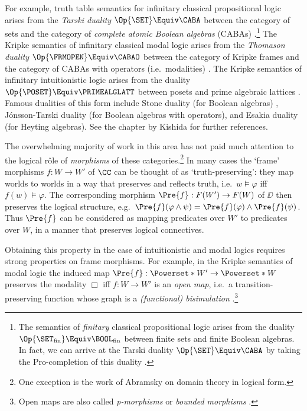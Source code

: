 \documentclass[a4paper,UKenglish,cleveref, autoref]{lipics-v2021}
\begin{document}
For example, truth table semantics for infinitary classical propositional logic
arises from the \emph{Tarski duality} $\Op{\SET} \Equiv \CABA$ between the
category of sets and the category of \emph{complete atomic Boolean algebras}
(CABAs) \cite[\S 1]{kishida_2018}.\footnote{The semantics of \emph{finitary} classical
  propositional logic arises from the duality 
  \(\Op{\SET_{\text{fin}}} \Equiv \BOOL_{\text{fin}}\)
  between finite sets and finite Boolean algebras. In
  fact, we can arrive at the Tarski duality \(\Op{\SET} \Equiv \CABA\) by taking
the Pro-completion of this duality \cite{kurz_2012}.}
The Kripke semantics of infinitary classical modal logic
\cite{kripke_1963,kripke_1963b} arises from the \emph{Thomason duality}
$\Op{\FRMOPEN} \Equiv \CABAO$ between the category of Kripke frames and the category
of CABAs with operators (i.e.\ modalities) \cite{thomason_1975} \cite[\S
2.4]{kishida_2018}. The Kripke semantics of infinitary intuitionistic logic
\cite{kripke_1965b} arises from the duality $\Op{\POSET} \Equiv \PRIMEALGLATT$
between posets and prime algebraic lattices \cite{nielsen_1981,kavvos_2024a}.
Famous dualities of this form include Stone duality (for Boolean algebras)
\cite{johnstone_1982}, J\'{o}nsson-Tarski duality
\cite{jonsson_1951,hansoul_1983,sambin_1988} (for Boolean algebras with
operators), and Esakia duality \cite{esakia_2019} (for Heyting algebras). See
the chapter by Kishida \cite{kishida_2018} for further references.

The overwhelming majority of work in this area has not paid much attention to
the logical r\^{o}le of \emph{morphisms} of these categories.\footnote{One
exception is the work of Abramsky \cite{abramsky_1991} on domain theory in
logical form.} In many cases the `frame' morphisms $f : W \to W'$ of $\CC$ can
be thought of as `truth-preserving': they map worlds to worlds in a way that
preserves and reflects truth, i.e.\ $w \vDash \varphi$ iff $f(w) \vDash
\varphi$. The corresponding morphism $\Pre{f} : F(W') \to F(W)$ of $\DD$ then
preserves the logical structure, e.g.\ $\Pre{f}(\varphi \land \psi) =
\Pre{f}(\varphi) \land \Pre{f}(\psi)$. Thus $\Pre{f}$ can be considered as
mapping predicates over $W'$ to predicates over $W$, in a manner that
preserves logical connectives.

Obtaining this property in the case of intuitionistic and modal logics requires
strong properties on frame morphisms. For example, in the Kripke semantics of
modal logic the induced map $\Pre{f} : \Powerset*{W'} \to \Powerset*{W}$
preserves the modality $\Box$ iff $f : W \to W'$ is an \emph{open map}, i.e.\ a
transition-preserving function whose graph is a \emph{(functional) bisimulation}
\cite[\S 2.4]{kishida_2018}.\footnote{Open maps are also called
  \emph{p-morphisms} \cite[\S 2.3]{chagrov_1996} or \emph{bounded morphisms}
\cite[\S 2.1]{blackburn_2001}.}
\end{document}
